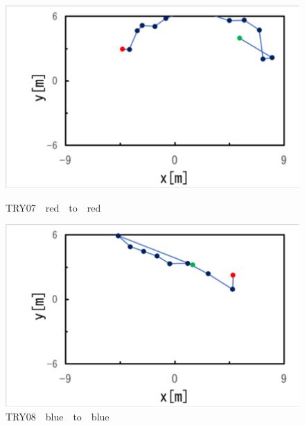 \begin{figure}[ht]
  \begin{center}
    
    \includegraphics[clip,width=15.0cm]{figure/TRY07_red_to_red.eps}
    \caption{TRY07　red　to　red}
    \label{fig:try07}
    
    \includegraphics[width=15.0cm]{figure/TRY08_blue_to_blue.eps}
    \caption{TRY08　blue　to　blue}
    \label{ig:try08}
    
  \end{center}
\end{figure}

